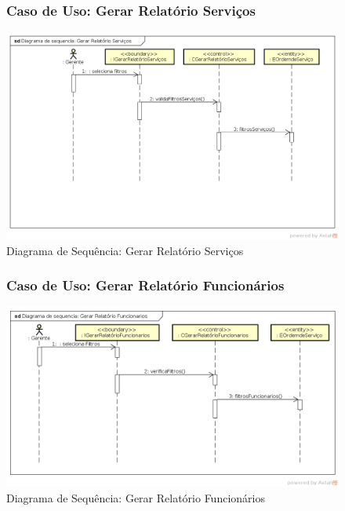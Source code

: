 \documentclass[
	12pt,				%
	openright,
	oneside,			%
	a4paper,			%
	chapter=TITLE,		%
	brazil				%
	]{abntex2}
\begin{document}
\begin{figure}[h!]

\subsubsection*{Caso de Uso: Gerar Relatório Serviços}


	\caption{Diagrama de Sequência: Gerar Relatório Serviços}
	\begin{center}
	    \includegraphics[scale=0.5]{Arquivos/Projeto/D_relatorio_servicos}  
	\end{center}
\end{figure}



\begin{figure}[h!]

\subsubsection*{Caso de Uso: Gerar Relatório Funcionários}


	\caption{Diagrama de Sequência: Gerar Relatório Funcionários}
	\begin{center}
	    \includegraphics[scale=0.5]{Arquivos/Projeto/D_relatorio_funcionarios}  
	\end{center}
\end{figure}
\end{document}
